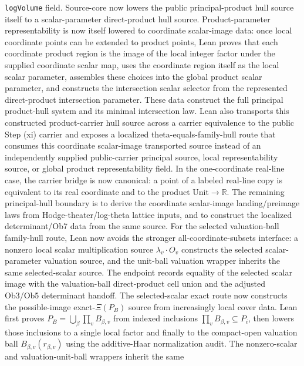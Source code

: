 \begin{proposition}
  \texttt{logVolume} field.  Source-core now lowers the public
  principal-product hull source itself to a scalar-parameter direct-product
  hull source.  Product-parameter representability is now itself lowered to
  coordinate scalar-image data: once local coordinate points can be extended to
  product points, Lean proves that each coordinate product region is the image
  of the local integer factor under the supplied coordinate scalar map, uses
  the coordinate region itself as the local scalar parameter, assembles these
  choices into the global product scalar parameter, and constructs the
  intersection scalar selector from the represented direct-product
  intersection parameter.
  These data construct the full principal product-hull system and its minimal
  intersection law.  Lean also transports this constructed product-carrier
  hull source across a carrier equivalence to the public Step (xi) carrier and
  exposes a localized theta-equals-family-hull route that consumes this
  coordinate scalar-image transported source instead of an independently
  supplied public-carrier principal source, local representability source, or
  global product representability field.  In the one-coordinate real-line
  case, the carrier bridge is now canonical: a point of a labeled real-line
  copy is equivalent to its real coordinate and to the product
  \(\mathrm{Unit}\to\mathbb{R}\).  The remaining principal-hull boundary is
  to derive the coordinate scalar-image landing/preimage laws from
  Hodge-theater/log-theta lattice inputs, and to construct the localized
  determinant/Ob7 data from the same source.
  For the selected valuation-ball family-hull route, Lean now avoids the
  stronger all-coordinate-subsets interface: a nonzero local scalar
  multiplication source \(\lambda_v\cdot O_v\) constructs the selected
  scalar-parameter valuation source, and the unit-ball valuation wrapper
  inherits the same selected-scalar source.  The endpoint records equality of
  the selected scalar image with the valuation-ball direct-product cell union
  and the adjusted Ob3/Ob5 determinant handoff.  The selected-scalar exact
  route now constructs the possible-image exact-\(\Xi(P_B)\) source from
  increasingly local cover data.  Lean first proves
  \(P_B=\bigcup_\beta\prod_v B_{\beta,v}\) from indexed inclusions
  \(\prod_v B_{\beta,v}\subseteq P_i\), then lowers those inclusions to a
  single local factor and finally to the compact-open valuation ball
  \(B_{\beta,v}(r_{\beta,v})\) using the additive-Haar normalization audit.
  The nonzero-scalar and valuation-unit-ball wrappers inherit the same

\end{proposition}
